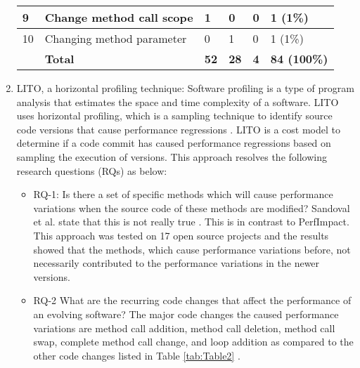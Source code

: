 \documentclass[article,type=msc,colorback,12pt,accentcolor=tud8b,table]{tudthesis}
\begin{document}
\begin{enumerate}
\begin{table}[]
\begin{tabular}{|l|l|l|l|l|l|}
		9  & Change method call scope                             & 1                                  & 0                                  & 0                                    & 1 (1\%)                                \\ \hline
		10 & Changing method parameter                            & 0                                  & 1                                  & 0                                    & 1 (1\%)                                \\ \hline
		& \textbf{Total}                                       & \textbf{52}                        & \textbf{28}                        & \textbf{4}                           & \textbf{84 (100\%)}                    \\ \hline
	\end{tabular}
\end{table}

\item{LITO, a horizontal profiling technique:} 
Software profiling is a type of program analysis that estimates the space and time complexity of a software. LITO uses horizontal profiling, which is a sampling technique to identify source code versions that cause performance regressions \cite{sandoval2016learning}. LITO is a cost model to determine if a code commit has caused performance regressions based on sampling the execution of versions. This approach resolves the following research questions (RQs) as below:

\begin{itemize}

\item RQ-1: Is there a set of specific methods which will cause performance variations when the source code of these methods are modified? Sandoval et al. state that this is not really true \cite{sandoval2016learning}. This is in contrast to PerfImpact. This approach was tested on 17 open source projects and the results showed that the methods, which cause performance variations before, not necessarily contributed to the performance variations in the newer versions.

\item RQ-2  What are the recurring code changes that affect the performance of an evolving software? The major code changes the caused performance variations are method call addition, method call deletion, method call swap, complete method call change, and loop addition  as compared to the other code changes listed in Table \ref{tab:Table2} \cite{sandoval2016learning}.

\end{itemize}
\end{enumerate}	
\end{document}
